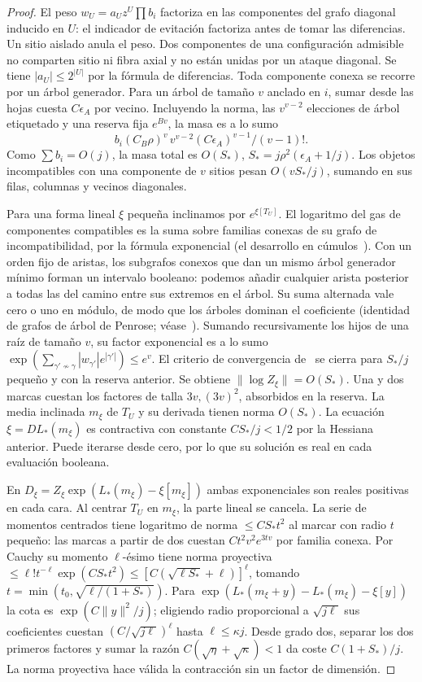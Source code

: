 \begin{proof}
El peso \(w_U=a_Uz^U\prod b_i\) factoriza en las componentes del grafo diagonal
inducido en \(U\): el indicador de evitación factoriza antes de tomar las diferencias.
Un sitio aislado anula el peso. Dos componentes de una configuración admisible no
comparten sitio ni fibra axial y no están unidas por un ataque diagonal.
Se tiene \(|a_U|\le2^{|U|}\) por la fórmula de diferencias. Toda componente conexa
se recorre por un árbol generador. Para un árbol de tamaño \(v\) anclado en \(i\),
sumar desde las hojas cuesta \(C\epsilon_A\)
por vecino. Incluyendo la norma, las \(v^{v-2}\) elecciones de árbol etiquetado y
una reserva fija \(e^{Bv}\), la masa es a lo sumo
\[
 b_i(C_B\rho)^v\,v^{v-2}(C\epsilon_A)^{v-1}/(v-1)! .
\]
Como \(\sum b_i=O(j)\), la masa total es \(O(S_*)\),
\(S_*=j\rho^2(\epsilon_A+1/j)\). Los objetos incompatibles con una componente de
\(v\) sitios pesan \(O(vS_*/j)\), sumando en sus filas, columnas y vecinos diagonales.

Para una forma lineal \(\xi\) pequeña inclinamos por \(e^{\xi[T_U]}\).
El logaritmo del gas de componentes compatibles es la suma sobre familias conexas
de su grafo de incompatibilidad, por la fórmula exponencial (el desarrollo en cúmulos~\cite{kp,fp}). Con un
orden fijo de
aristas, los subgrafos conexos que dan un mismo árbol generador mínimo forman un intervalo
booleano: podemos añadir cualquier arista posterior a todas las del camino entre sus
extremos en el árbol. Su suma alternada vale cero o uno en módulo, de modo que los
árboles dominan el coeficiente (identidad de grafos de árbol de Penrose; véase~\cite{fp}). Sumando
recursivamente los hijos de una raíz de
tamaño \(v\), su factor exponencial es a lo sumo
\(\exp(\sum_{\gamma'\not\sim\gamma}|w_{\gamma'}|e^{|\gamma'|})\le e^v\).
El criterio de convergencia de~\cite{kp} se cierra para \(S_*/j\) pequeño y con la reserva
anterior. Se obtiene
\(\|\log Z_\xi\|=O(S_*)\). Una y dos marcas cuestan los factores de talla \(3v,(3v)^2\),
absorbidos en la reserva. La media inclinada \(m_\xi\) de \(T_U\) y su derivada tienen
norma \(O(S_*)\). La ecuación \(\xi=DL_*(m_\xi)\) es contractiva con constante
\(CS_*/j<1/2\) por la Hessiana anterior. Puede iterarse desde cero, por lo que su solución
es real en cada evaluación booleana.

En \(D_\xi=Z_\xi\exp(L_*(m_\xi)-\xi[m_\xi])\) ambas exponenciales son reales positivas
en cada cara. Al centrar \(T_U\) en \(m_\xi\), la parte lineal se cancela. La serie
de momentos centrados tiene logaritmo de norma \(\le CS_* t^2\) al marcar con radio \(t\)
pequeño: las marcas a partir de dos cuestan \(C t^2v^2 e^{3tv}\) por familia conexa.
Por Cauchy su momento \(\ell\)-ésimo tiene norma proyectiva
\(\le\ell!t^{-\ell}\exp(CS_*t^2)\le[C(\sqrt{\ell S_*}+\ell)]^\ell\), tomando
\(t=\min(t_0,\sqrt{\ell/(1+S_*)})\). Para
\(\exp(L_*(m_\xi+y)-L_*(m_\xi)-\xi[y])\) la cota es \(\exp(C\|y\|^2/j)\);
eligiendo radio proporcional a \(\sqrt{j\ell}\) sus coeficientes cuestan
\((C/\sqrt{j\ell})^\ell\) hasta \(\ell\le\kappa j\). Desde grado dos, separar los dos
primeros factores y sumar la razón \(C(\sqrt{\eta}+\sqrt\kappa)<1\) da coste
\(C(1+S_*)/j\). La norma proyectiva hace válida la contracción sin un factor de dimensión.


\end{proof}
